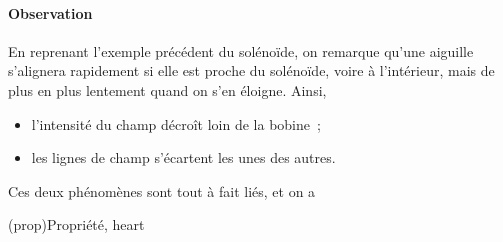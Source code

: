 \documentclass[../../main/main.tex]{subfiles}
\begin{document}
\paragraph*{Observation}
En reprenant l'exemple précédent du solénoïde, on remarque qu'une aiguille
s'alignera rapidement si elle est proche du solénoïde, voire à l'intérieur, mais
de plus en plus lentement quand on s'en éloigne. Ainsi,
\begin{itemize}
	\item l'intensité du champ décroît loin de la bobine~;
	\item les lignes de champ s'écartent les unes des autres.
\end{itemize}
Ces deux phénomènes sont tout à fait liés, et on a
\begin{tcb}(prop){Propriété, heart}
	\begin{center}
	\end{center}
\end{tcb}
\end{document}
